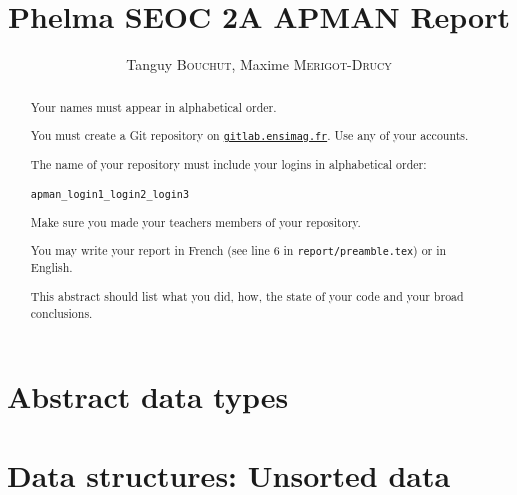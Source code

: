 \documentclass[a4paper,notitlepage]{report}
\newcommand{\authorOne}   {Tanguy \textsc{Bouchut}}
\newcommand{\authorTwo}   {Maxime \textsc{Merigot-Drucy}}
\begin{document}
\author{\authorOne, \authorTwo}
\title{Phelma {SEOC} 2A {APMAN} Report}

\hypersetup{pageanchor=false}
\begin{titlepage}
  \maketitle

  \begin{abstract}

    Your names must appear in alphabetical order.

    You must create a Git repository on \href{https://gitlab.ensimag.fr}{\texttt{gitlab.ensimag.fr}}. Use any of your accounts.

    The name of your repository must include your logins in alphabetical order:

    \hspace{3cm}\texttt{apman\_login1\_login2\_login3}

    Make sure you made your teachers members of your repository. 

    You may write your report in French (see line 6 in \texttt{report/preamble.tex}) or in English.

    This abstract should list what you did, how, the state of your code and your broad conclusions.
  \end{abstract}

\end{titlepage}
\hypersetup{pageanchor=true}

\tableofcontents

\listoffigures
{}




\part{Abstract data types}








\part{Data structures: Unsorted data}


\end{document}
